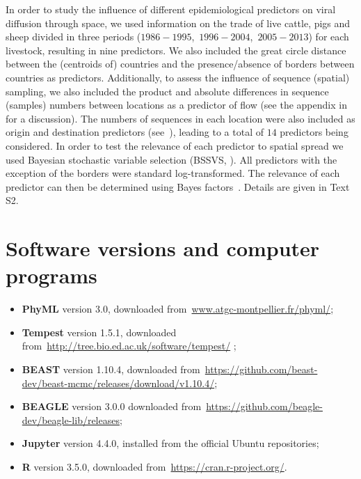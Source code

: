 \documentclass[10pt]{article}
\begin{document}
In order to study the influence of different epidemiological predictors on viral diffusion through space, we used information on the trade of live cattle, pigs and sheep divided in three periods ($1986-1995$,~$1996-2004$,~$2005-2013$) for each livestock, resulting in nine predictors. %
We also included the great circle distance between the (centroids of) countries and the presence/absence of borders between countries as predictors.
Additionally, to assess the influence of sequence (spatial) sampling, we also included the product and absolute differences in sequence (samples) numbers between locations as a predictor of flow (see the appendix in~\cite{Lemey2014} for a discussion).
The numbers of sequences in each location were also included as origin and destination predictors (see~\cite{Dudas2017}), leading to a total of $14$ predictors being considered.
In order to test the relevance of each predictor to spatial spread we used Bayesian stochastic variable selection (BSSVS, \cite{Lemey2009}).
All predictors with the exception of the borders were standard log-transformed. %
The relevance of each predictor can then be determined using Bayes factors~\citep{KassRaftery1995,Lemey2009,Lemey2014}.
Details are given in Text S2.

\section*{Software versions and computer programs}

\begin{itemize}
 \item \textbf{PhyML} version 3.0, downloaded from~\url{www.atgc-montpellier.fr/phyml/};
 \item \textbf{Tempest} version 1.5.1, downloaded from~\url{http://tree.bio.ed.ac.uk/software/tempest/}  ;
 \item \textbf{BEAST} version 1.10.4, downloaded from~\url{https://github.com/beast-dev/beast-mcmc/releases/download/v1.10.4/};
 \item \textbf{BEAGLE} version 3.0.0 downloaded from~\url{https://github.com/beagle-dev/beagle-lib/releases};
 \item  \textbf{Jupyter} version 4.4.0, installed from the official Ubuntu repositories;
 \item \textbf{R} version 3.5.0, downloaded from~\url{https://cran.r-project.org/}.
\end{itemize}
\end{document}
